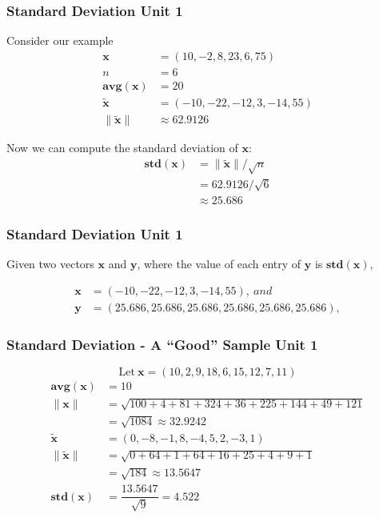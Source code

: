 \documentclass[12pt]{beamer}
\newcommand{\FrameTitle}[2]{\frametitle{#1 \hfill \small\textnormal{\textcolor{midgray}{#2}}}}
\newcommand{\QuizQuestion}[1]{{\Large\textbf{\color{question}{#1}}}}
\newcommand{\MVec}[1]{\mathbf{#1}}
\newcommand{\Norm}[1]{\lVert {{#1}} \rVert}
\newcommand{\Avg}[1]{\mathbf{avg}{(\MVec{#1})}}
\newcommand{\Std}[1]{\mathbf{std}(\MVec{#1})}
\begin{document}
\begin{frame}\FrameTitle{Standard Deviation}{Unit 1}
Consider our example
\begin{align*}
    \MVec{x} &= (10, -2, 8, 23, 6, 75)\\[4pt]
    n &= 6\\[4pt]
    \Avg{x} &= 20\\[4pt]
    \tilde{\MVec{x}} &= (-10, -22, -12, 3, -14, 55)\\[4pt]
    \Norm{\tilde{\MVec{x}}} &\approx 62.9126
\end{align*}

Now we can compute the standard deviation of $\MVec{x}$:
\begin{align*}
    \Std{\MVec{x}} &= \Norm{\tilde{\MVec{x}}}/\sqrt{n} \\[4pt]
                   &= 62.9126/\sqrt{6} \\[4pt]
                   &\approx 25.686
\end{align*}
\end{frame}

\begin{frame}\FrameTitle{Standard Deviation}{Unit 1}
Given two vectors $\MVec{x}$ and $\MVec{y}$,
where the value of each entry of $\MVec{y}$ is
$\Std{\MVec{x}}$,

\begin{align*}
    \MVec{x} &= (-10, -22, -12, 3, -14, 55), \ and \\[4pt]
    \MVec{y} &= (25.686, 25.686, 25.686, 25.686, 25.686, 25.686),
\end{align*}

\QuizQuestion{what is $\Norm{\MVec{x}}$ and $\Norm{\MVec{y}}$?}
\end{frame}

\begin{frame}\FrameTitle{Standard Deviation - A ``Good'' Sample}{Unit 1}
    \[
        \text{Let} \ \MVec{x} = (10, 2, 9, 18, 6, 15, 12, 7, 11)
    \]
    \begin{align*}
        \Avg{x} &= 10 \\[3pt]
        \Norm{\MVec{x}} &= \sqrt{100 + 4 + 81 + 324 + 36 + 225 + 144 + 49 + 121} \\[3pt]
                        &= \sqrt{1084} \approx 32.9242 \\[3pt]
        \tilde{\MVec{x}} &= (0, -8, -1, 8, -4, 5, 2, -3, 1) \\[3pt]
        \Norm{\tilde{\MVec{x}}} &= \sqrt{0+64+1+64+16+25+4+9+1}\\[3pt]
                                   &= \sqrt{184} \approx 13.5647\\[3pt]
        \Std{\MVec{x}} &= \dfrac{13.5647}{\sqrt{9}} = 4.522
    \end{align*}
\end{frame}
\end{document}
